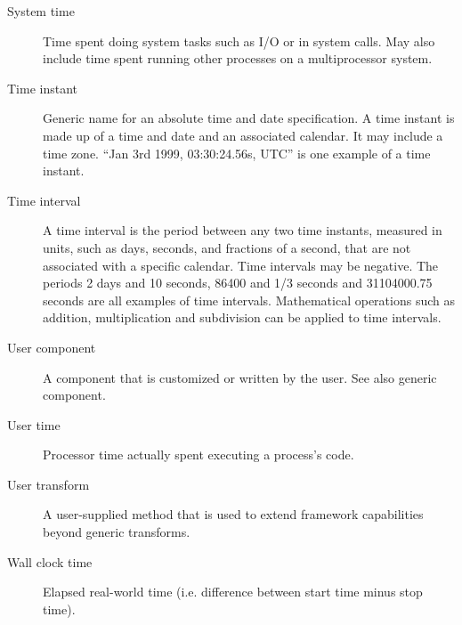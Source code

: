 \begin{description}
\item [System time] \label{SysTime}Time spent doing system tasks such as I/O or in system calls.  May also
include time spent running other processes on a multiprocessor system.

\item [Time instant] \label{glos:TimeInstant}
Generic name for an absolute time and date specification. A time instant is made 
up of a time and date and an associated calendar. It may include a time zone.
``Jan 3rd 1999, 03:30:24.56s, UTC'' is one example of a time instant.

\item [Time interval] \label{glos:TimeInterval} A time interval is the
period between any two time instants, measured in units, such as days, 
seconds, and fractions of a second, that are not associated with a specific
calendar.  Time intervals may be negative.  The periods 2 days and 10 seconds, 
86400 and 1/3 seconds and 31104000.75 seconds are all examples of time intervals.  
Mathematical operations such as addition, multiplication and subdivision 
can be applied to time intervals.

\item [User component] \label{UserComp} A component that is customized or
written by the user.  See also generic component.

\item [User time] \label{UserTime} Processor time actually spent executing a process's code.

\item[User transform] \label{glos:UserTrans} A user-supplied 
  method that is used to extend framework capabilities beyond generic 
  transforms.  

\item [Wall clock time] \label{WallClockTime} Elapsed real-world time (i.e. difference between start time minus
stop time).

\end{description}








































